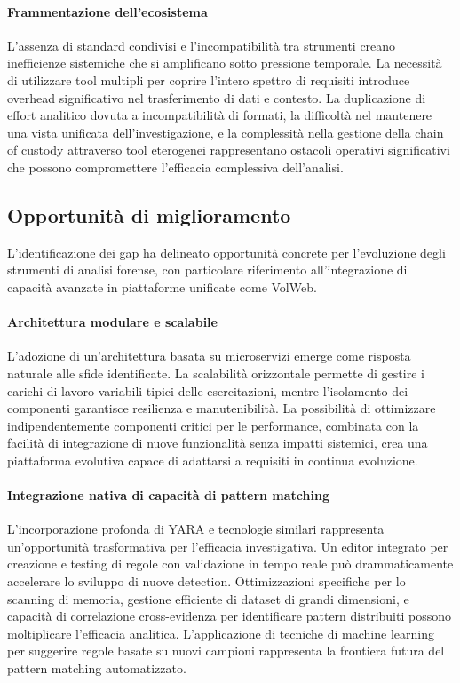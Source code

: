 \paragraph{Frammentazione dell'ecosistema}
L'assenza di standard condivisi e l'incompatibilità tra strumenti creano inefficienze sistemiche che si amplificano sotto pressione temporale. La necessità di utilizzare tool multipli per coprire l'intero spettro di requisiti introduce overhead significativo nel trasferimento di dati e contesto. La duplicazione di effort analitico dovuta a incompatibilità di formati, la difficoltà nel mantenere una vista unificata dell'investigazione, e la complessità nella gestione della chain of custody attraverso tool eterogenei rappresentano ostacoli operativi significativi che possono compromettere l'efficacia complessiva dell'analisi.

\subsection{Opportunità di miglioramento}

L'identificazione dei gap ha delineato opportunità concrete per l'evoluzione degli strumenti di analisi forense, con particolare riferimento all'integrazione di capacità avanzate in piattaforme unificate come VolWeb.

\paragraph{Architettura modulare e scalabile}
L'adozione di un'architettura basata su microservizi emerge come risposta naturale alle sfide identificate. La scalabilità orizzontale permette di gestire i carichi di lavoro variabili tipici delle esercitazioni, mentre l'isolamento dei componenti garantisce resilienza e manutenibilità. La possibilità di ottimizzare indipendentemente componenti critici per le performance, combinata con la facilità di integrazione di nuove funzionalità senza impatti sistemici, crea una piattaforma evolutiva capace di adattarsi a requisiti in continua evoluzione.

\paragraph{Integrazione nativa di capacità di pattern matching}
L'incorporazione profonda di YARA e tecnologie similari rappresenta un'opportunità trasformativa per l'efficacia investigativa. Un editor integrato per creazione e testing di regole con validazione in tempo reale può drammaticamente accelerare lo sviluppo di nuove detection. Ottimizzazioni specifiche per lo scanning di memoria, gestione efficiente di dataset di grandi dimensioni, e capacità di correlazione cross-evidenza per identificare pattern distribuiti possono moltiplicare l'efficacia analitica. L'applicazione di tecniche di machine learning per suggerire regole basate su nuovi campioni rappresenta la frontiera futura del pattern matching automatizzato.

